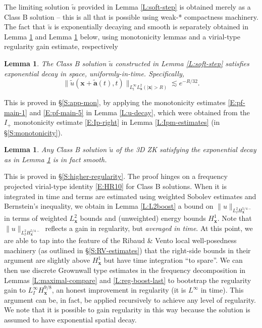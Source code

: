 \documentclass[12pt,letterpaper]{amsart}
\newtheorem{lemma}[theorem]{Lemma}
\theoremstyle{remark}
\numberwithin{equation}{section}
\numberwithin{theorem}{section}
\numberwithin{table}{section}
\begin{document}
The limiting solution $\tilde u$ provided in Lemma \ref{L:soft-step} is obtained merely as a Class B solution -- this is all that is possible using weak-* compactness machinery.  The fact that $\tilde u$ is exponentially decaying and smooth is separately obtained in Lemma \ref{L:exp-decay} and Lemma \ref{L:regularity-boost} below, using monotonicity lemmas and a virial-type regularity gain estimate, respectively

\begin{lemma}
\label{L:exp-decay}
The Class B solution $\tilde u$ constructed in Lemma \ref{L:soft-step} satisfies exponential decay in space, uniformly-in-time.  Specifically, 
$$
\| \tilde u(\mathbf{x}+\tilde{\mathbf{a}}(t),t) \|_{L_t^\infty L^2_{\mathbf{x}}(|\mathbf{x}|>R)} \lesssim e^{-R/32}.
$$
\end{lemma}

This is proved in \S \ref{S:app-mon}, by applying the monotonicity estimates \eqref{E:pf-main-1} and \eqref{E:pf-main-5} in Lemma \ref{L:u-decay}, which were obtained from the $I_+$  monotonicity estimate \eqref{E:Ip-right} in Lemma \ref{L:Ipm-estimates} (in \S\ref{S:monotonicity}).  

 
\begin{lemma}
\label{L:regularity-boost}
Any Class B solution $\tilde u$ of the 3D ZK satisfying the exponential decay as in Lemma \ref{L:exp-decay} is in fact smooth.
\end{lemma}

This is proved in \S \ref{S:higher-regularity}.  The proof hinges on a frequency projected virial-type identity \eqref{E:HR10} for Class B solutions.  When it is integrated in time and terms are estimated using weighted Sobolev estimates and Bernstein's inequality, we obtain in Lemma \ref{L:L2boost} a bound on $\|u\|_{L_I^2 H_{\mathbf{x}}^{5/4-}}$ in terms of weighted $L^2_{\mathbf{x}}$ bounds and (unweighted) energy bounds $H_{\mathbf{x}}^1$.  Note that $\|u\|_{L_I^2 H_{\mathbf{x}}^{5/4-}}$ reflects a gain in regularity, but \emph{averaged in time}.    At this point, we are able to tap into the feature of the Ribaud \& Vento local well-posedness machinery (as outlined in \S\ref{S:RV-estimates}) that the right-side bounds in their argument are slightly above $H_{\mathbf{x}}^1$ but have time integration ``to spare''.  We can then use discrete Grownwall type estimates in the frequency decomposition in Lemmas \ref{L:maximal-compare} and \ref{L:reg-boost-last} to bootstrap the regularity gain to $L_I^\infty H_{\mathbf{x}}^{9/8}$, an honest improvement in regularity (it is $L^\infty$ in time).  This argument can be, in fact, be applied recursively to achieve any level of regularity.   We note that it is possible to gain regularity in this way because the solution is assumed to have exponential spatial decay.  
\end{document}
